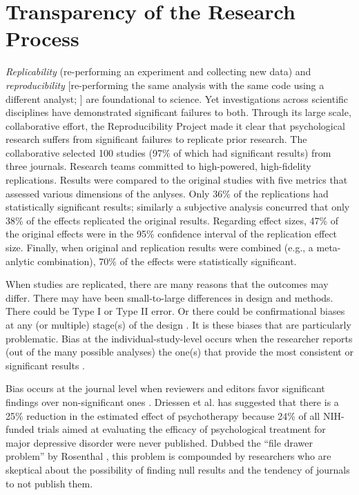 \documentclass[
  11pt,
]{book}
\begin{document}
\hypertarget{transparency-of-the-research-process}{%
\section{Transparency of the Research Process}\label{transparency-of-the-research-process}}

\emph{Replicability} (re-performing an experiment and collecting new data) and \emph{reproducibility} {[}re-performing the same analysis with the same code using a different analyst; \citet{patil_statistical_2016}{]} are foundational to science. Yet investigations across scientific disciplines have demonstrated significant failures to both. Through its large scale, collaborative effort, the Reproducibility Project\citep{open_science_collaboration_estimating_2015} made it clear that psychological research suffers from significant failures to replicate prior research. The collaborative selected 100 studies (97\% of which had significant results) from three journals. Research teams committed to high-powered, high-fidelity replications. Results were compared to the original studies with five metrics that assessed various dimensions of the anlyses. Only 36\% of the replications had statistically significant results; similarly a subjective analysis concurred that only 38\% of the effects replicated the original results. Regarding effect sizes, 47\% of the original effects were in the 95\% confidence interval of the replication effect size. Finally, when original and replication results were combined (e.g., a meta-anlytic combination), 70\% of the effects were statistically significant.

When studies are replicated, there are many reasons that the outcomes may differ. There may have been small-to-large differences in design and methods. There could be Type I or Type II error. Or there could be confirmational biases at any (or multiple) stage(s) of the design \citep{stevens_replicability_2017}. It is these biases that are particularly problematic. Bias at the individual-study-level occurs when the researcher reports (out of the many possible analyses) the one(s) that provide the most consistent or significant results \citep{hengartner_raising_2018, van_t_veer_pre-registration_2016}.

Bias occurs at the journal level when reviewers and editors favor significant findings over non-significant ones \citep{stevens_replicability_2017}. Driessen et al. \citeyearpar{driessen_does_2015} has suggested that there is a 25\% reduction in the estimated effect of psychotherapy because 24\% of all NIH-funded trials aimed at evaluating the efficacy of psychological treatment for major depressive disorder were never published. Dubbed the ``file drawer problem'' by Rosenthal \citeyearpar{rosenthal_file_1979}, this problem is compounded by researchers who are skeptical about the possibility of finding null results and the tendency of journals to not publish them.
\end{document}
